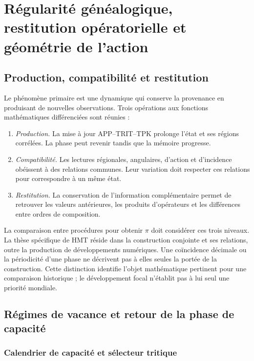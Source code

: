 \section{Régularité généalogique, restitution opératorielle et géométrie de l'action}
\label{md:restop:seccion}

\subsection{Production, compatibilité et restitution}
\label{md:restop:jerarquia}

Le phénomène primaire est une dynamique qui conserve la provenance en produisant de nouvelles observations. Trois opérations aux fonctions mathématiques différenciées sont réunies :
\begin{enumerate}
 \item \emph{Production.} La mise à jour APP--TRIT--TPK prolonge l'état et ses régions corrélées. La phase peut revenir tandis que la mémoire progresse.
 \item \emph{Compatibilité.} Les lectures régionales, angulaires, d'action et d'incidence obéissent à des relations communes. Leur variation doit respecter ces relations pour correspondre à un même état.
 \item \emph{Restitution.} La conservation de l'information complémentaire permet de retrouver les valeurs antérieures, les produits d'opérateurs et les différences entre ordres de composition.
\end{enumerate}
La comparaison entre procédures pour obtenir $\pi$ doit considérer ces trois niveaux. La thèse spécifique de HMT réside dans la construction conjointe et ses relations, outre la production de développements numériques. Une coïncidence décimale ou la périodicité d'une phase ne décrivent pas à elles seules la portée de la construction. Cette distinction identifie l'objet mathématique pertinent pour une comparaison historique ; le développement focal n'établit pas à lui seul une priorité mondiale.

\subsection{Régimes de vacance et retour de la phase de capacité}
\label{md:restop:vacancias}

\subsubsection{Calendrier de capacité et sélecteur tritique}
\label{md:restop:antecedentes-capacidad}

